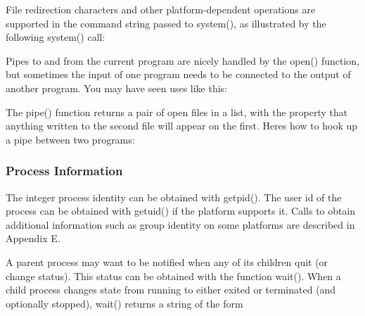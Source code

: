 
File redirection characters and other platform-dependent operations are
supported in the command string passed to \textsf{system()}, as
illustrated by the following \textsf{system()} call:


Pipes to and from the current program are nicely handled by the
\textsf{open()} function, but sometimes the input of one program needs
to be connected to the output of another program. You may have seen
uses like this:


The \textsf{pipe()} function returns a pair of open files in a list,
with the property that anything written to the second file will appear
on the first. Here{\textquotesingle}s how to hook up a pipe between two
programs:


\subsubsection{Process Information}
The integer process identity can be obtained with
\textsf{getpid()}. The user id of the process can be
obtained with \textsf{getuid()} if the platform
supports it. Calls to obtain additional information such as group
identity on some platforms are described in Appendix E.

A parent process may want to be notified when any of its children quit
(or change status). This status can be obtained with the function
\textsf{wait()}. When a child process changes state from
{\textquotedbl}running{\textquotedbl} to either
{\textquotedbl}exited{\textquotedbl} or
{\textquotedbl}terminated{\textquotedbl} (and optionally
{\textquotedbl}stopped{\textquotedbl}), \textsf{wait()} returns a
string of the form


